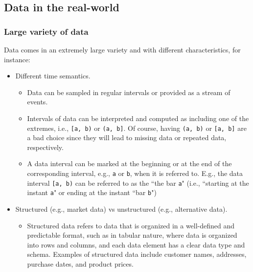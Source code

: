 \documentclass[11pt, reqno]{amsart}
\theoremstyle{definition}
\theoremstyle{remark}
\begin{document}
  \subsection{Data in the real-world}

  \subsubsection{Large variety of data}

  Data comes in an extremely large variety and with different characteristics,
  for instance:

  \begin{itemize}
    \item Different time semantics.
      \begin{itemize}
        \item Data can be sampled in regular intervals or provided as a stream of
          events.

        \item Intervals of data can be interpreted and computed as including one
          of the extremes, i.e., \verb|[a, b)| or \verb|(a, b]|. Of course,
          having \verb|(a, b)| or \verb|[a, b]| are a bad choice since they will
          lead to missing data or repeated data, respectively.

        \item A data interval can be marked at the beginning or at the end of the
          corresponding interval, e.g., \verb|a| or \verb|b|, when it is referred
          to. E.g., the data interval \verb|[a, b)| can be referred to as the ``the
          bar \verb|a|" (i.e., ``starting at the instant \verb|a|" or ending at the
          instant ``bar \verb|b|")
      \end{itemize}

    \item Structured (e.g., market data) vs unstructured (e.g., alternative data).
      \begin{itemize}
        \item Structured data refers to data that is organized in a well-defined
          and predictable format, such as in tabular nature, where data is organized
          into rows and columns, and each data element has a clear data type and
          schema. Examples of structured data include customer names, addresses,
          purchase dates, and product prices.


\end{itemize}
\end{itemize}
\end{document}
